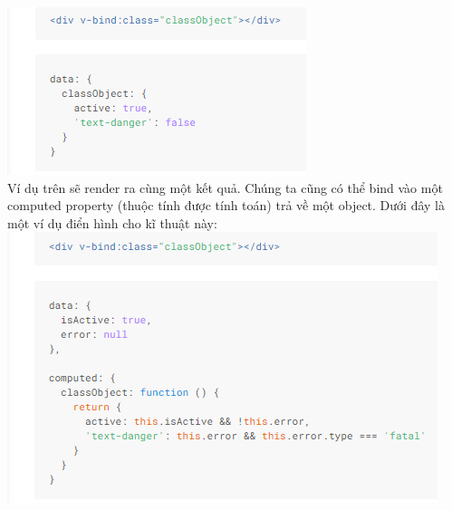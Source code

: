 \documentclass[12pt,a4paper]{report}
\begin{document}
\includegraphics[scale=1]{25}\\Ví dụ trên sẽ render ra cùng một kết quả. Chúng ta cũng có thể bind vào một computed property (thuộc tính được tính toán) trả về một object. Dưới đây là một ví dụ điển hình cho kĩ thuật này:\\
\includegraphics[scale=1]{26}\\
\end{document}
